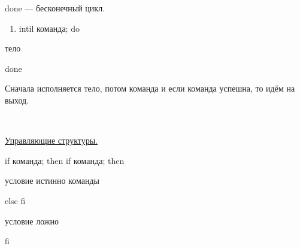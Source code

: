 \par 
done — бесконечный цикл.
\begin{enumerate}
	\item \par 
	intil команда; do
\end{enumerate}
\par 
тело
\par 
done
\par 
Сначала исполняется тело, потом команда
и если команда успешна, то идём на выход.
\par 
\\

\par 
\underline{Управляющие структуры.}
\par 
if
команда; then                                               if
команда; then
\par 
условие истинно                                        
      команды
\par 
elsc                                                                 
    fi
\par 
условие ложно
\par 
fi
\par 
\\

\par 
\\

